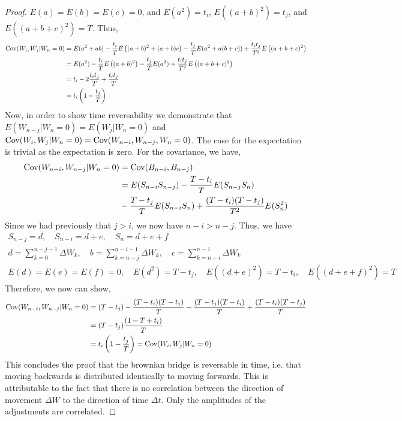 \documentclass{article}
\begin{document}
\begin{proof}
        $E(a) = E(b) = E(c) = 0$, and $E(a^2) = t_i$, $E((a+b)^2) = t_j$, and
        $E((a+b+c)^2) = T$. Thus, 
        \begin{align*}
            \text{Cov}(W_i, W_j | W_n = 0) &= E(a^2 + ab) - \frac{t_i}{T}E\left((a + b)^2
            + (a + b)c\right) - \frac{t_j}{T}E(a^2 + a(b+c)) +
            \frac{t_it_j}{T^2}E\left((a+b+c)^2\right)
            \\
            &= E(a^2) - \frac{t_i}{T}E\left((a + b)^2\right) - 
            \frac{t_j}{T}E(a^2) +
            \frac{t_it_j}{T^2}E\left((a+b+c)^2\right)
            \\
            &= t_i - 2\frac{t_it_j}{T} + \frac{t_it_j}{T}
            \\
            &= t_i\left(1 - \frac{t_j}{T}\right)
        \end{align*}
        Now, in order to show time reversability we demonstrate that $E(W_{n-j}
        | W_n = 0) = E(W_{j} | W_n = 0)$ and $\text{Cov}(W_i,W_j|W_n = 0) =
        \text{Cov}(W_{n-i},W_{n-j},W_n=0)$. The case for the expectation is trivial as
        the expectation is zero. For the covariance, we have,
        \begin{align*}
           \text{Cov}(W_{n-i},W_{n-j}|W_n=0) &= \text{Cov}(B_{n-i},B_{n-j}) 
           \\
           &= E(S_{n-i}S_{n-j}) - \frac{T-t_i}{T}E(S_{n-j}S_n) 
           \\
           &-
           \frac{T - t_j}{T}E(S_{n-i}S_n) +
            \frac{(T-t_i)(T-t_j)}{T^2}E(S_n^2)
        \end{align*}
        Since we had previously that $j > i$, we now have $n-i > n-j$. Thus, we 
        have 
        \begin{gather*}
            S_{n-j} = d, \quad S_{n-i} = d + e, \quad S_n = d + e + f
            \\
            d = \sum_{k=0}^{n-j-1} \Delta W_k, \quad b = \sum_{k=n-j}^{n-i-1}   
            \Delta W_k, \quad c = \sum_{k=n-i}^{n-1}\Delta W_k
            \\
            E(d) = E(e) = E(f) = 0, \quad E(d^2) = T - t_j, \quad E((d+e)^2) = T
            - t_i, \quad E((d + e + f)^2) = T
        \end{gather*}
        Therefore, we now can show,
        \begin{align*}
            \text{Cov}(W_{n-i},W_{n-j}|W_n=0) &= (T-t_j) -
            \frac{(T-t_i)(T-t_j)}{T} -
           \frac{(T - t_j)(T-t_i)}{T} +
            \frac{(T-t_i)(T-t_j)}{T}
            \\
            &= (T-t_j)\frac{(1 - T + t_i)}{T}
            \\
            &= t_i\left(1 - \frac{t_j}{T}\right) = \text{Cov}(W_i, W_j | W_n = 0)
        \end{align*}
        This concludes the proof that the brownian bridge is reversable in time,
        i.e. that moving backwards is distributed identically to moving
        forwards. This is attributable to the fact that there is no correlation
        between the direction of movement $\Delta W$ to the direction of time
        $\Delta t$. Only the amplitudes of the adjustments are correlated. 
    \end{proof}
\end{document}
